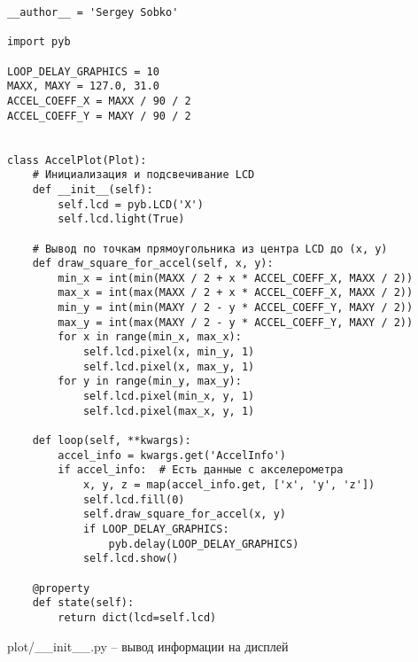 \documentclass[document.tex]{subfiles}
\begin{document}
\begin{listing}[ht]
\begin{verbatim}
__author__ = 'Sergey Sobko'

import pyb

LOOP_DELAY_GRAPHICS = 10
MAXX, MAXY = 127.0, 31.0
ACCEL_COEFF_X = MAXX / 90 / 2
ACCEL_COEFF_Y = MAXY / 90 / 2


class AccelPlot(Plot):
    # Инициализация и подсвечивание LCD
    def __init__(self):
        self.lcd = pyb.LCD('X')
        self.lcd.light(True) 
    
    # Вывод по точкам прямоугольника из центра LCD до (x, y)
    def draw_square_for_accel(self, x, y):
        min_x = int(min(MAXX / 2 + x * ACCEL_COEFF_X, MAXX / 2))
        max_x = int(max(MAXX / 2 + x * ACCEL_COEFF_X, MAXX / 2))
        min_y = int(min(MAXY / 2 - y * ACCEL_COEFF_Y, MAXY / 2))
        max_y = int(max(MAXY / 2 - y * ACCEL_COEFF_Y, MAXY / 2))
        for x in range(min_x, max_x):
            self.lcd.pixel(x, min_y, 1)
            self.lcd.pixel(x, max_y, 1)
        for y in range(min_y, max_y):
            self.lcd.pixel(min_x, y, 1)
            self.lcd.pixel(max_x, y, 1)

    def loop(self, **kwargs):
        accel_info = kwargs.get('AccelInfo')
        if accel_info:  # Есть данные с акселерометра
            x, y, z = map(accel_info.get, ['x', 'y', 'z'])
            self.lcd.fill(0)
            self.draw_square_for_accel(x, y)
            if LOOP_DELAY_GRAPHICS:
                pyb.delay(LOOP_DELAY_GRAPHICS)
            self.lcd.show()
            
    @property
    def state(self):
        return dict(lcd=self.lcd)
\end{verbatim}
\caption{plot/\_\_init\_\_.py -- вывод информации на дисплей}
\label{lst:lcd}
\end{listing}
\end{document}
